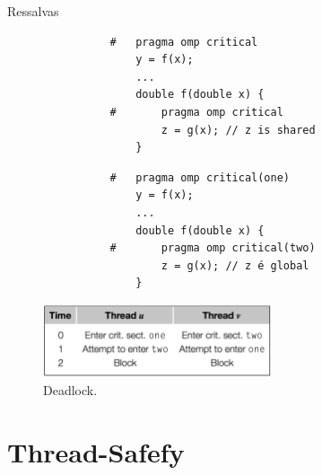 	\begin{frame}[fragile]{Ressalvas}
		\begin{multicols}{2}
			\begin{verbatim}
				#	pragma omp critical
					y = f(x);
					...
					double f(double x) {
				#		pragma omp critical
						z = g(x); // z is shared
					}
			\end{verbatim}
		\columnbreak
			\begin{verbatim}
				#	pragma omp critical(one)
					y = f(x);
					...
					double f(double x) {
				#		pragma omp critical(two)
						z = g(x); // z é global
					}
			\end{verbatim}
		\end{multicols}

		\begin{figure}[p]
			\centering
			\includegraphics[width=0.6\textwidth]{img/pacheco/deadlock.png}
			\caption{Deadlock.}
		\end{figure}
\end{frame}











\section{Thread-Safefy}
